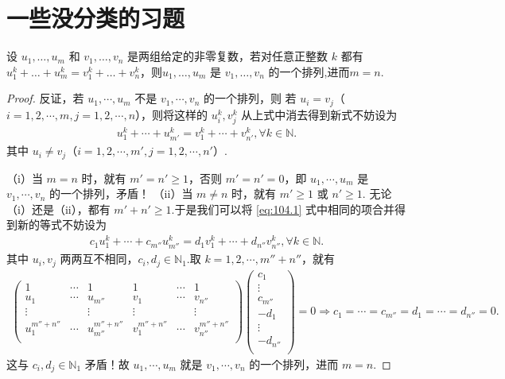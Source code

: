\documentclass[../../main.tex]{subfiles}
\begin{document}
\section{一些没分类的习题}

\begin{lemma}\label{lemma:引理1564561}
设 $u_1,\dots,u_m$ 和 $v_1,\dots,v_n$ 是两组给定的非零复数，若对任意正整数 $k$ 都有 $u_1^k+\dots+u_m^k=v_1^k+\dots+v_n^k$，则$u_1,\dots,u_m$ 是 $v_1,\dots,v_n$ 的一个排列,进而$m=n$.
\end{lemma}
\begin{proof}
反证，若 $u_1,\cdots ,u_m$ 不是 $v_1,\cdots ,v_n$ 的一个排列，则
若 $u_i=v_j$（$i=1,2,\cdots ,m,j=1,2,\cdots ,n$），则将这样的 $u_{i}^{k},v_{j}^{k}$ 从上式中消去得到新式不妨设为
\begin{align}
u_{1}^{k}+\cdots +u_{m'}^{k}=v_{1}^{k}+\cdots +v_{n'}^{k},\forall k\in \mathbb{N} .\label{eq:104.1}
\end{align}
其中 $u_i\ne v_j$（$i=1,2,\cdots ,m',j=1,2,\cdots ,n'$）.

（i）当 $m=n$ 时，就有 $m' =n' \geqslant 1$，否则 $m' =n' =0$，即 $u_1,\cdots ,u_m$ 是 $v_1,\cdots ,v_n$ 的一个排列，矛盾！
（ii）当 $m\ne n$ 时，就有 $m' \geqslant 1$ 或 $n' \geqslant 1$.
无论（i）还是（ii），都有 $m' +n' \geqslant 1$.于是我们可以将 \eqref{eq:104.1} 式中相同的项合并得到新的等式不妨设为
\begin{align*}
c_1u_{1}^{k}+\cdots +c_{m''}u_{m''}^{k}=d_1v_{1}^{k}+\cdots +d_{n''}v_{n''}^{k},\forall k\in \mathbb{N} .
\end{align*}
其中 $u_i,v_j$ 两两互不相同，$c_i,d_j\in \mathbb{N} _1$.取 $k=1,2,\cdots ,m'' +n''$，就有
\begin{align*}
\begin{pmatrix}
1&		\cdots&		1&		1&		\cdots&		1\\
u_1&		\cdots&		u_{m''}&		v_1&		\cdots&		v_{n''}\\
\vdots&		&		\vdots&		\vdots&		&		\vdots\\
u_{1}^{m'' +n''}&		\cdots&		u_{m''}^{m'' +n''}&		v_{1}^{m'' +n''}&		\cdots&		v_{n''}^{m'' +n''}\\
\end{pmatrix} \begin{pmatrix}
c_1\\
\vdots\\
c_{m''}\\
-d_1\\
\vdots\\
-d_{n''}\\
\end{pmatrix} =0\Rightarrow c_1=\cdots =c_{m''}=d_1=\cdots =d_{n''}=0.
\end{align*}
这与 $c_i,d_j\in \mathbb{N} _1$ 矛盾！故 $u_1,\cdots ,u_m$ 就是 $v_1,\cdots ,v_n$ 的一个排列，进而 $m=n$.
\end{proof}
\end{document}
